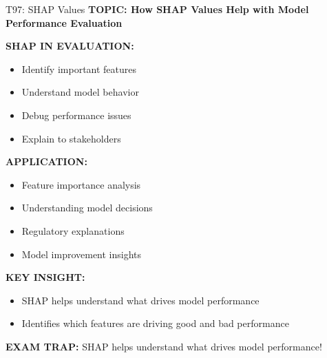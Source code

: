 \documentclass[8pt]{beamer}
\begin{document}
	\begin{frame}{T97: SHAP Values}
		\fontsize{6.5}{7.5}\selectfont
		\textbf{TOPIC: How SHAP Values Help with Model Performance Evaluation}
		
		\vspace{0.1cm}
		\textbf{SHAP IN EVALUATION:}
		\begin{itemize}
			\item Identify important features
			\item Understand model behavior
			\item Debug performance issues
			\item Explain to stakeholders
		\end{itemize}
		
		\vspace{0.1cm}
		\textbf{APPLICATION:}
		\begin{itemize}
			\item Feature importance analysis
			\item Understanding model decisions
			\item Regulatory explanations
			\item Model improvement insights
		\end{itemize}
		
		\vspace{0.1cm}
		\textbf{KEY INSIGHT:}
		\begin{itemize}
			\item SHAP helps understand what drives model performance
			\item Identifies which features are driving good and bad performance
		\end{itemize}
		
		\textcolor{myred}{\textbf{EXAM TRAP:}} SHAP helps \textcolor{myblue}{understand what drives model performance}!
	\end{frame}
	
\end{document}
